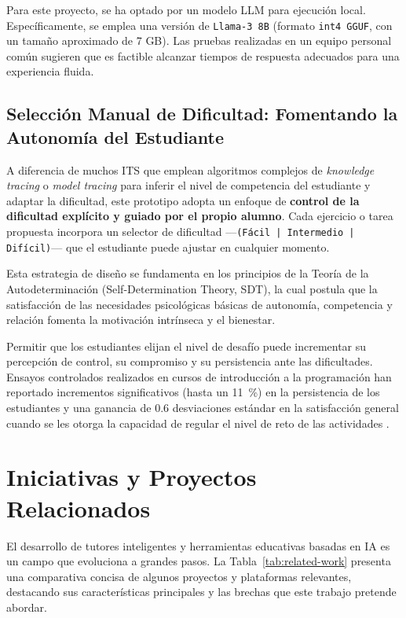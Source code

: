 Para este proyecto, se ha optado por un modelo LLM para ejecución local. Específicamente, se emplea una versión de \texttt{Llama-3 8B} (formato \texttt{int4 GGUF}, con un tamaño aproximado de 7 GB). Las pruebas realizadas en un equipo personal común sugieren que es factible alcanzar tiempos de respuesta adecuados para una experiencia fluida.

\subsection{Selección Manual de Dificultad: Fomentando la Autonomía del Estudiante}
\label{ssec:seleccion_manual_dificultad}

A diferencia de muchos ITS que emplean algoritmos complejos de \emph{knowledge tracing} o \emph{model tracing} para inferir el nivel de competencia del estudiante y adaptar la dificultad, este prototipo adopta un enfoque de \textbf{control de la dificultad explícito y guiado por el propio alumno}. Cada ejercicio o tarea propuesta incorpora un selector de dificultad —\texttt{(Fácil | Intermedio | Difícil)}— que el estudiante puede ajustar en cualquier momento.

Esta estrategia de diseño se fundamenta en los principios de la Teoría de la Autodeterminación (Self-Determination Theory, SDT), la cual postula que la satisfacción de las necesidades psicológicas básicas de autonomía, competencia y relación fomenta la motivación intrínseca y el bienestar.

Permitir que los estudiantes elijan el nivel de desafío puede incrementar su percepción de control, su compromiso y su persistencia ante las dificultades. Ensayos controlados realizados en cursos de introducción a la programación han reportado incrementos significativos (hasta un \SI{11}{\percent}) en la persistencia de los estudiantes y una ganancia de \(0.6\) desviaciones estándar en la satisfacción general cuando se les otorga la capacidad de regular el nivel de reto de las actividades \cite{Dempere2023}.

\section{Iniciativas y Proyectos Relacionados}
\label{sec:proyectos_relacionados}

El desarrollo de tutores inteligentes y herramientas educativas basadas en IA es un campo que evoluciona a grandes pasos. La Tabla~\ref{tab:related-work} presenta una comparativa concisa de algunos proyectos y plataformas relevantes, destacando sus características principales y las brechas que este trabajo pretende abordar.

